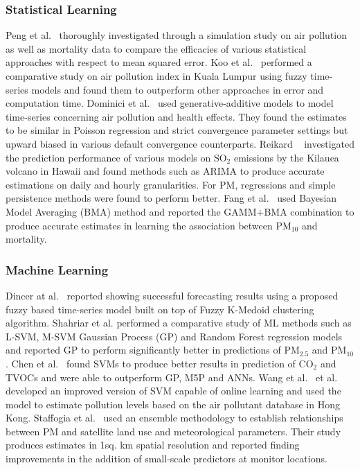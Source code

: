 \documentclass[10pt,journal]{IEEEtran}
\begin{document}
\subsubsection{Statistical Learning} Peng et al.~\cite{Peng.2006} thoroughly investigated through a simulation study on air pollution as well as mortality data to compare the efficacies of various statistical approaches with respect to mean squared error. Koo et al.~\cite{Koo.2020} performed a comparative study on air pollution index in Kuala Lumpur using fuzzy time-series models and found them to outperform other approaches in error and computation time. Dominici et al.~\cite{Dominici.2002} used generative-additive models to model time-series concerning air pollution and health effects. They found the estimates to be similar in Poisson regression and strict convergence parameter settings but upward biased in various default convergence counterparts. Reikard ~\cite{Reikard.2019} investigated the prediction performance of various models on SO${_2}$ emissions by the Kilauea volcano in Hawaii and found methods such as ARIMA to produce accurate estimations on daily and hourly granularities. For PM, regressions and simple persistence methods were found to perform better. Fang et al.~\cite{Fang.2016} used Bayesian Model Averaging (BMA) method and reported the GAMM+BMA combination to produce accurate estimates in learning the association between PM${_{10}}$ and mortality.

\subsubsection{Machine Learning} Dincer at al.~\cite{Dincer.2018} reported showing successful forecasting results using a proposed fuzzy based time-series model built on top of Fuzzy K-Medoid clustering algorithm. Shahriar et al.\cite{Shahriar.2020} performed a comparative study of ML methods such as L-SVM, M-SVM Gaussian Process (GP) and Random Forest regression models and reported GP to perform significantly better in predictions of PM${_{2.5}}$ and PM${_{10}}$. Chen et al.~\cite{Chen.2018} found SVMs to produce better results in prediction of CO${_2}$ and TVOCs and were able to outperform GP, M5P and ANNs. Wang et al.~\cite{Wang.2008} et al. developed an improved version of SVM capable of online learning and used the model to estimate pollution levels based on the air pollutant database in Hong Kong. Staffogia et al.~\cite{Staffogia.2019} used an ensemble methodology to establish relationships between PM and satellite land use and meteorological parameters. Their study produces estimates in 1sq. km spatial resolution and reported finding improvements in the addition of small-scale predictors at monitor locations.
\end{document}
